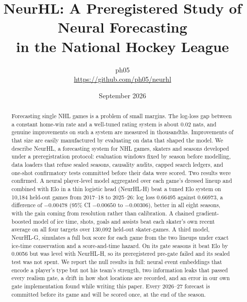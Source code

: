 \documentclass[11pt]{article}
\title{\textbf{NeurHL: A Preregistered Study of Neural Forecasting\\in the National Hockey League}}
\author{ph05\\[2pt]\small\url{https://github.com/ph05/neurhl}}
\date{September 2026}
\newcommand{\neurhl}{NeurHL}
\newcommand{\neurhlH}{NeurHL-H}
\newcommand{\neurhlG}{NeurHL-G}
\begin{document}
\maketitle

\begin{abstract}
\noindent
Forecasting single NHL games is a problem of small margins. The log-loss gap
between a constant home-win rate and a well-tuned rating system is about 0.02
nats, and genuine improvements on such a system are measured in thousandths.
Improvements of that size are easily manufactured by evaluating on data that
shaped the model. We describe \neurhl{}, a forecasting system for NHL games,
skaters and seasons developed under a preregistration protocol: evaluation
windows fixed by season before modelling, data loaders that refuse sealed
seasons, causality audits, capped search ledgers, and one-shot confirmatory
tests committed before their data were scored. Two results were confirmed. A
neural player-level model aggregated over each game's dressed lineup and
combined with Elo in a thin logistic head (\neurhlH{}) beat a tuned Elo system on
10,184 held-out games from 2017--18 to 2025--26: log loss 0.66495 against
0.66973, a difference of $-0.00478$ (95\% CI $-0.00650$ to $-0.00306$), better in
all eight seasons, with the gain coming from resolution rather than
calibration. A chained gradient-boosted model of ice time, shots, goals and
assists beat each skater's own recent average on all four targets over 130,092
held-out skater-games. A third model, \neurhlG{}, simulates a full box score for
each game from the two lineups under exact ice-time conservation and a
score-and-time hazard. On its gate seasons it beat Elo by 0.0056 but was level
with \neurhlH{}, so its preregistered pre-gate failed and its sealed test was not
spent. We report the null results in full: neural event embeddings that encode
a player's type but not his team's strength, two information leaks that passed
every realism gate, a drift in how shot locations are recorded, and an error in
our own gate implementation found while writing this paper. Every 2026--27
forecast is committed before its game and will be scored once, at the end of
the season.
\end{abstract}














\clearpage
\appendix

\end{document}
